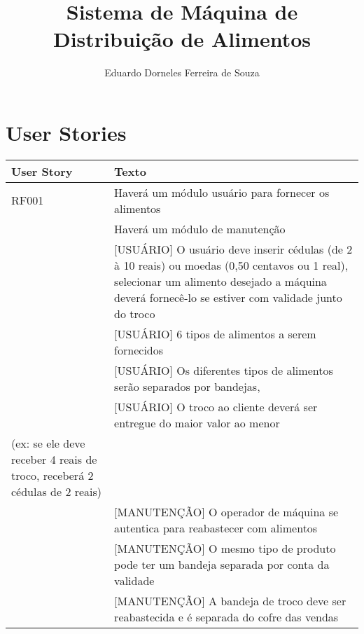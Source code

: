\documentclass[oneside]{article}
\begin{document}
\title{Sistema de Máquina de Distribuição de Alimentos  \\
        \large }
\author{Eduardo Dorneles Ferreira de Souza}
\maketitle

\pagestyle{plain}

\section{User Stories}

\begin{center}
    \begin{tabular}{| l | p{11cm} |}
        \hline
        User Story & Texto\\ \hline
        RF001 & Haverá um módulo usuário para fornecer os alimentos\\ \hline
        & Haverá um módulo de manutenção\\ \hline
        & [USUÁRIO] O usuário deve inserir cédulas (de 2 à 10 reais) ou moedas
            (0,50 centavos ou 1 real), selecionar um alimento desejado
            a máquina deverá fornecê-lo se estiver com validade junto do troco\\ \hline
        & [USUÁRIO] 6 tipos de alimentos a serem fornecidos\\
        & [USUÁRIO] Os diferentes tipos de alimentos serão separados por bandejas, \\ \hline
        & [USUÁRIO] O troco ao cliente deverá ser entregue do maior valor ao menor \\ \hline
                    (ex: se ele deve receber 4 reais de troco, receberá 2 cédulas
                    de 2 reais) \\ \hline
        & [MANUTENÇÃO] O operador de máquina se autentica para reabastecer com
                        alimentos\\ \hline
        & [MANUTENÇÃO] O mesmo tipo de produto pode ter um bandeja separada por
            conta da validade\\ \hline
        & [MANUTENÇÃO] A bandeja de troco deve ser reabastecida e é separada
                        do cofre das vendas \\
        \hline
    \end{tabular}
\end{center}

\clearpage
\end{document}
